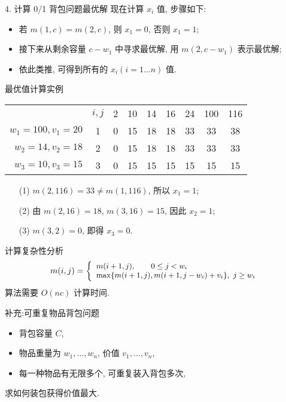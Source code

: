 \documentclass[fontset=fandol,UTF8,fleqn]{beamer}
\begin{document}
\begin{frame}{4. 计算 0/1 背包问题最优解}
现在计算 $x_i$ 值, 步骤如下:
    \begin{itemize}[<+-|alert@+>]
\item 若 $m(1,c)=m(2,c)$, 则 $x_1=0$, 否则 $x_1=1$;  
\item 接下来从剩余容量 $c-w_1$ 中寻求最优解, 用 $m(2,c-w_1)$ 表示最优解; 
\item 依此类推, 可得到所有的 $x_i(i=1\ldots n)$ 值. 
\end{itemize}
\end{frame}

\begin{frame}{最优值计算实例}
\begin{table}[c]
  \centering
  \begin{tabular}{rc|ccccccc}
& $i,j$ & 2  & 10 & 14 & 16 & 24 & 100 & 116 \\
\cline{2-9}
$w_1=100, v_1=20$ & 1  & 0 & 15 & 18 & 18 & 33 & 33 & 38 \\

$w_2=14, v_2=18$ & 2  & 0 & 15 & 18 & 18  & 33 & 33 & 33 \\

$w_3=10, v_3=15$ & 3  & 0 & 15 & 15 & 15 & 15 & 15 & 15 \\
  \end{tabular}
\end{table}
    \begin{itemize}[<+-|alert@+>]
\item[(1)] $m(2,116)=33\neq m(1,116)$, 所以 $x_1=1$; 
\item[(2)] 由 $m(2,16)=18$,  $m(3,16)=15$, 因此 $x_2 =1$; 
\item[(3)] $m(3,2)=0$, 即得 $x_3=0$. 
\end{itemize}
\end{frame}

\begin{frame}{计算复杂性分析}
\begin{eqnarray*}
\small{
  m(i,j)=\left\{\begin{array}{ll}
m(i+1, j), \qquad 0\leq j < w_i \\ 
\mathrm{max}\{m(i+1,j), m(i+1, j-w_i)+v_i\},\  j\geq w_i   
\end{array}\right.
}
\end{eqnarray*}
 算法需要 $O(nc)$ 计算时间. 
\end{frame}

\begin{frame}{补充:可重复物品背包问题}
    \begin{itemize}[<+-|alert@+>]
\item 背包容量 $C$,
\item 物品重量为 $w_1, \ldots, w_n$, 价值 $v_1, \ldots, v_n$,
\item 每一种物品有无限多个, 可重复装入背包多次,
\end{itemize} \pause
求如何装包获得价值最大.
\end{frame}
\end{document}
